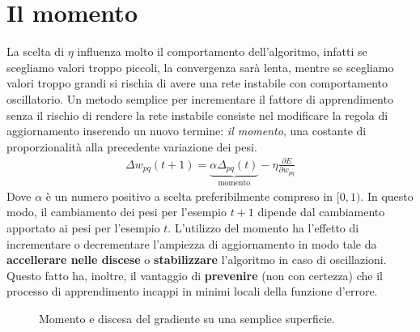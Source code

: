 \newpage


\section{Il momento} %
\label{sub:il_momento}
La scelta di $\eta$ influenza molto il comportamento dell'algoritmo, infatti se scegliamo valori troppo piccoli, la convergenza sarà lenta, mentre se scegliamo valori troppo grandi si rischia di avere una rete instabile con comportamento oscillatorio.
Un metodo semplice per incrementare il fattore di apprendimento senza il rischio di rendere la rete instabile consiste nel modificare la regola di aggiornamento inserendo un nuovo termine: \emph{il momento}, una costante di proporzionalità alla precedente variazione dei pesi.
\begin{align}
    \Delta w_{pq} (t + 1) = \underbrace{\alpha \Delta_{pq} (t)}_\textrm{momento} - \eta \frac{\partial E}{\partial w_{pq}}
\end{align}
Dove $\alpha$ è un numero positivo a scelta preferibilmente compreso in $[0,1)$. In questo modo, il cambiamento dei pesi per l’esempio $t+1$ dipende dal cambiamento apportato ai pesi per l’esempio $t$.
L'utilizzo del momento ha l'effetto di incrementare o decrementare l'ampiezza di aggiornamento in modo tale da \textbf{accellerare nelle discese} o \textbf{stabilizzare} l'algoritmo in caso di oscillazioni. Questo fatto ha, inoltre, il vantaggio di \textbf{prevenire} (non con certezza) che il processo di apprendimento incappi in minimi locali della funzione d'errore.

\begin{figure}[h!]
    \centering
    \qquad
    \caption{Momento e discesa del gradiente su una semplice superficie.}
\end{figure}

